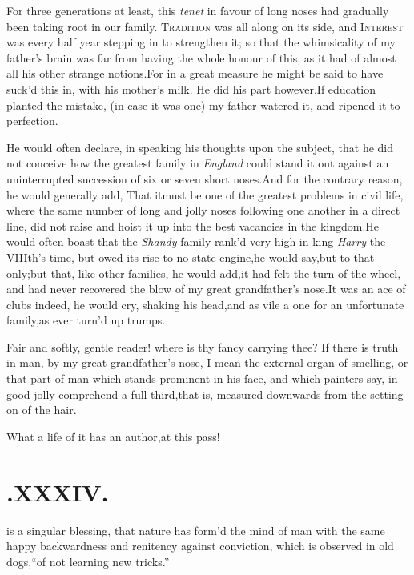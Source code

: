 \documentclass{article}
\begin{document}
For three generations at least, this \textit{te\-net} in favour of
long noses had gradually been taking root in our family.\tsh
\textsc{Tradition} was all along on its side, and
\textsc{Interest} was every half year stepping in to strengthen
it; so that the whimsicality of my father’s brain was far
from
having the whole honour of this, as it had of almost all his
other strange notions.\tsk For in a great measure he might be
said to have suck’d this in, with his mother’s milk. He did his
part however.\tsh If\break
education planted the mistake, (in case it was one) my father
watered it, and ri\-pened it to perfection.

He would often declare, in speaking his thoughts upon the
subject, that he did not conceive how the greatest family in
\textit{England} could stand it out against an uninterrupted
succession of six or seven short noses.\tsk And for the contrary
reason, he would generally add, That it\break must be one of
the greatest problems in civil life, where the same number of long
and jolly noses following one another in a direct line, did not
raise and hoist it up into the best vacancies in the
kingdom.\tsh He would often boast that the \textit{Shandy}
family rank’d very high in king \textit{Harry} the
VIIIth’s time, but owed its rise to no state engine,\tsk he
would say,\tsk but to that only;\tsh but that, like other
families, he would add,\tsh it had felt the turn of the
wheel, and had never recovered the blow of my
great grandfather’s nose.\tsh It was an ace of clubs
indeed, he would cry, shaking his head,\tsk and as vile a one for
an unfortunate family,\break as ever turn’d up trumps.

\tsh Fair and softly, gentle reader!\break
\tsh where is thy fancy carrying thee?\break
\tsh If there is truth in man, by my
great grandfather’s nose, I mean the external organ of smelling,
or that part of man which stands prominent in his
face,
\tsk and which painters say, in good jolly\break
{}\break
comprehend a full third,\tsh that is, measured
downwards from the setting on of the hair.\tsh

\tsh What a life of it has an author,\break at this pass!

\section{.\quad  XXXIV.}

 is a singular blessing, that
nature has form’d the mind of man with the same happy
backwardness and renitency against conviction, which is observed in
old dogs,\tsk “of not learning new tricks.”
\end{document}
